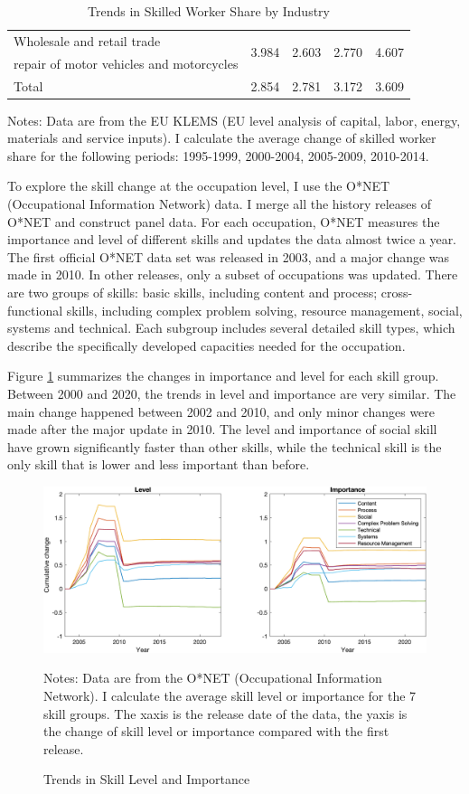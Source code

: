 \documentclass[12pt]{article}
\begin{document}
\begin{table}[h!]
\begin{center}
\begin{tabular}{l|cccc}
Wholesale and retail trade & \multirow{2}{*}{3.984} & \multirow{2}{*}{2.603} & \multirow{2}{*}{2.770} & \multirow{2}{*}{4.607} \\
repair of motor vehicles and motorcycles &&&&\\
Total & 2.854  & 2.781 & 3.172  & 3.609 \\\hline
\end{tabular}
\end{center}
\caption{Trends in Skilled Worker Share by Industry}
\label{Industry_trend}
{\scriptsize Notes: Data are from the EU KLEMS (EU level analysis of capital, labor, energy, materials and service inputs). I calculate the average change of skilled worker share for the following periods: 1995-1999, 2000-2004, 2005-2009, 2010-2014.}
\end{table}

To explore the skill change at the occupation level, I use the O*NET (Occupational Information Network) data. I merge all the history releases of O*NET and construct panel data. For each occupation, O*NET measures the importance and level of different skills and updates the data almost twice a year. The first official O*NET data set was released in 2003, and a major change was made in 2010. In other releases, only a subset of occupations was updated. There are two groups of skills: basic skills, including content and process; cross-functional skills, including complex problem solving, resource management, social, systems and technical. Each subgroup includes several detailed skill types, which describe the specifically developed capacities needed for the occupation. 

Figure \ref{trend} summarizes the changes in importance and level for each skill group. Between 2000 and 2020, the trends in level and importance are very similar. The main change happened between 2002 and 2010, and only minor changes were made after the major update in 2010. The level and importance of social skill have grown significantly faster than other skills, while the technical skill is the only skill that is lower and less important than before. 

\begin{figure}[h!]
\includegraphics[width = \textwidth]{trend}
\caption{Trends in Skill Level and Importance}
\label{trend}
{\scriptsize Notes: Data are from the O*NET (Occupational Information Network). I calculate the average skill level or importance for the 7 skill groups. The xaxis is the release date of the data, the yaxis is the change of skill level or importance compared with the first release. }
\end{figure}
\end{document}
